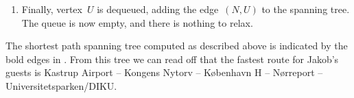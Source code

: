 \documentclass{jn-pset}
\begin{document}
\begin{problem}
\begin{solution}
\begin{enumerate}
  \item
    Finally, vertex~$U$ is dequeued,
    adding the edge~$(N, U)$
    to the spanning tree. The queue is now empty, and there is nothing
    to relax.
  \end{enumerate}
%   
  The shortest path spanning tree computed as described above is indicated
  by the bold edges in 
  .
  From this tree we can read off that the fastest route for Jakob's
  guests is
  Kastrup Airport
  --
  Kongens Nytorv
  --
  København H
  --
  Nørreport
  --
  Universitetsparken/DIKU.
\end{solution}

\end{problem}



%   
\end{document}
